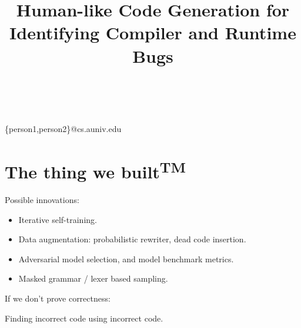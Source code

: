 


        
\title{Human-like Code Generation for Identifying Compiler and Runtime Bugs}

%
%
{ \\
          \\
        }
{\{person1,person2\}@cs.auniv.edu}

\maketitle






\section{The thing we built\textsuperscript{TM}}

Possible innovations:

\begin{itemize}
        \item Iterative self-training.
        \item Data augmentation: probabilistic rewriter, dead code insertion.
        \item Adversarial model selection, and model benchmark metrics.
        \item Masked grammar / lexer based sampling.
\end{itemize}

\noindent If we don't prove correctness:

Finding incorrect code using incorrect code.

